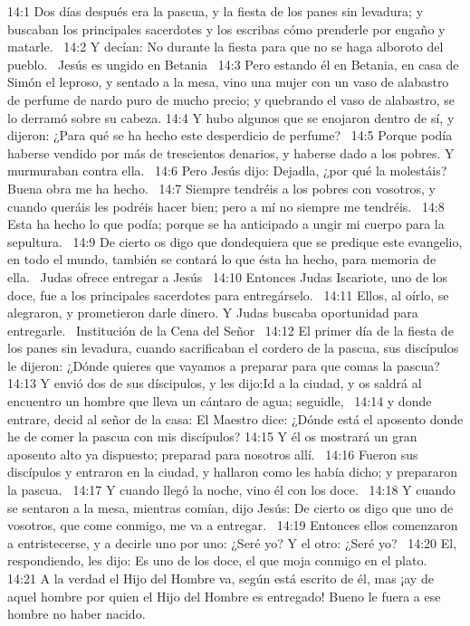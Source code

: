 14:1 Dos días después era la pascua, y la fiesta de los panes sin levadura; y buscaban los principales sacerdotes y los escribas cómo prenderle por engaño y matarle.  
14:2 Y decían: No durante la fiesta para que no se haga alboroto del pueblo.  
Jesús es ungido en Betania   
14:3 Pero estando él en Betania, en casa de Simón el leproso, y sentado a la mesa, vino una mujer con un vaso de alabastro de perfume de nardo puro de mucho precio; y quebrando el vaso de alabastro, se lo derramó sobre su cabeza. 
14:4 Y hubo algunos que se enojaron dentro de sí, y dijeron: ¿Para qué se ha hecho este desperdicio de perfume?  
14:5 Porque podía haberse vendido por más de trescientos denarios, y haberse dado a los pobres. Y murmuraban contra ella.  
14:6 Pero Jesús dijo: Dejadla, ¿por qué la molestáis? Buena obra me ha hecho.  
14:7 Siempre tendréis a los pobres con vosotros, y cuando queráis les podréis hacer bien; pero a mí no siempre me tendréis.  
14:8 Esta ha hecho lo que podía; porque se ha anticipado a ungir mi cuerpo para la sepultura.  
14:9 De cierto os digo que dondequiera que se predique este evangelio, en todo el mundo, también se contará lo que ésta ha hecho, para memoria de ella.  
Judas ofrece entregar a Jesús   
14:10 Entonces Judas Iscariote, uno de los doce, fue a los principales sacerdotes para entregárselo.  
14:11 Ellos, al oírlo, se alegraron, y prometieron darle dinero. Y Judas buscaba oportunidad para entregarle.  
Institución de la Cena del Señor   
14:12 El primer día de la fiesta de los panes sin levadura, cuando sacrificaban el cordero de la pascua, sus discípulos le dijeron: ¿Dónde quieres que vayamos a preparar para que comas la pascua?  
14:13 Y envió dos de sus díscipulos, y les dijo:Id a la ciudad, y os saldrá al encuentro un hombre que lleva un cántaro de agua; seguidle,  
14:14 y donde entrare, decid al señor de la casa: El Maestro dice: ¿Dónde está el aposento donde he de comer la pascua con mis discípulos? 
14:15 Y él os mostrará un gran aposento alto ya dispuesto; preparad para nosotros allí.  
14:16 Fueron sus discípulos y entraron en la ciudad, y hallaron como les había dicho; y prepararon la pascua.  
14:17 Y cuando llegó la noche, vino él con los doce.  
14:18 Y cuando se sentaron a la mesa, mientras comían, dijo Jesús: De cierto os digo que uno de vosotros, que come conmigo, me va a entregar.  
14:19 Entonces ellos comenzaron a entristecerse, y a decirle uno por uno: ¿Seré yo? Y el otro: ¿Seré yo?  
14:20 El, respondiendo, les dijo: Es uno de los doce, el que moja conmigo en el plato.  
14:21 A la verdad el Hijo del Hombre va, según está escrito de él, mas ¡ay de aquel hombre por quien el Hijo del Hombre es entregado! Bueno le fuera a ese hombre no haber nacido.  

